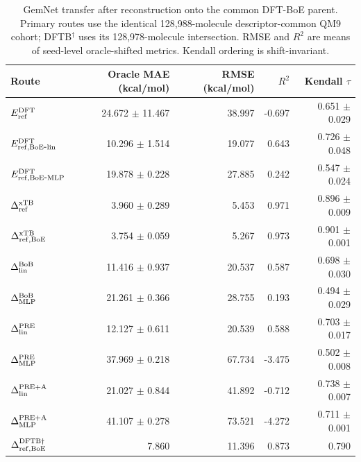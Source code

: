 \begin{table}[H]
\centering
\scriptsize
\setlength{\tabcolsep}{4pt}
\renewcommand{\arraystretch}{1.35}
\caption{GemNet transfer after reconstruction onto the common DFT-BoE parent. Primary routes use the identical 128,988-molecule descriptor-common QM9 cohort; DFTB$^\dagger$ uses its 128,978-molecule intersection. RMSE and $R^2$ are means of seed-level oracle-shifted metrics. Kendall ordering is shift-invariant.}
\begin{tabular}{lrrrr}
\toprule
Route & Oracle MAE (kcal/mol) & RMSE (kcal/mol) & $R^2$ & Kendall $\tau$ \\
\midrule
\(E_{\rm ref}^{\rm DFT}\) & 24.672 $\pm$ 11.467 & 38.997 & -0.697 & 0.651 $\pm$ 0.029 \\
\(E_{\rm ref,BoE\mbox{-}lin}^{\rm DFT}\) & 10.296 $\pm$ 1.514 & 19.077 & 0.643 & 0.726 $\pm$ 0.048 \\
\(E_{\rm ref,BoE\mbox{-}MLP}^{\rm DFT}\) & 19.878 $\pm$ 0.228 & 27.885 & 0.242 & 0.547 $\pm$ 0.024 \\
\(\Delta^{\rm xTB}_{\rm ref}\) & 3.960 $\pm$ 0.289 & 5.453 & 0.971 & 0.896 $\pm$ 0.009 \\
\(\Delta^{\rm xTB}_{\rm ref,BoE}\) & 3.754 $\pm$ 0.059 & 5.267 & 0.973 & 0.901 $\pm$ 0.001 \\
\(\Delta^{\rm BoB}_{\rm lin}\) & 11.416 $\pm$ 0.937 & 20.537 & 0.587 & 0.698 $\pm$ 0.030 \\
\(\Delta^{\rm BoB}_{\rm MLP}\) & 21.261 $\pm$ 0.366 & 28.755 & 0.193 & 0.494 $\pm$ 0.029 \\
\(\Delta^{\rm PRE}_{\rm lin}\) & 12.127 $\pm$ 0.611 & 20.539 & 0.588 & 0.703 $\pm$ 0.017 \\
\(\Delta^{\rm PRE}_{\rm MLP}\) & 37.969 $\pm$ 0.218 & 67.734 & -3.475 & 0.502 $\pm$ 0.008 \\
\(\Delta^{\rm PRE+A}_{\rm lin}\) & 21.027 $\pm$ 0.844 & 41.892 & -0.712 & 0.738 $\pm$ 0.007 \\
\(\Delta^{\rm PRE+A}_{\rm MLP}\) & 41.107 $\pm$ 0.278 & 73.521 & -4.272 & 0.711 $\pm$ 0.001 \\
\(\Delta^{\rm DFTB\dagger}_{\rm ref,BoE}\) & 7.860 & 11.396 & 0.873 & 0.790 \\
\bottomrule
\end{tabular}
\end{table}

